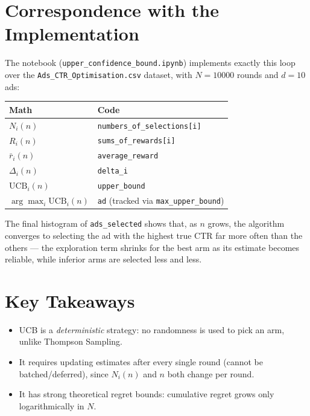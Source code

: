 \documentclass[11pt]{article}
\begin{document}
\section{Correspondence with the Implementation}

The notebook (\texttt{upper\_confidence\_bound.ipynb}) implements exactly
this loop over the \texttt{Ads\_CTR\_Optimisation.csv} dataset, with
$N = 10000$ rounds and $d = 10$ ads:

\begin{center}
\begin{tabular}{ll}
\textbf{Math} & \textbf{Code} \\
\hline
$N_i(n)$ & \texttt{numbers\_of\_selections[i]} \\
$R_i(n)$ & \texttt{sums\_of\_rewards[i]} \\
$\bar{r}_i(n)$ & \texttt{average\_reward} \\
$\Delta_i(n)$ & \texttt{delta\_i} \\
$\text{UCB}_i(n)$ & \texttt{upper\_bound} \\
$\arg\max_i \text{UCB}_i(n)$ & \texttt{ad} (tracked via \texttt{max\_upper\_bound}) \\
\end{tabular}
\end{center}

The final histogram of \texttt{ads\_selected} shows that, as $n$ grows, the
algorithm converges to selecting the ad with the highest true CTR far more
often than the others --- the exploration term shrinks for the best arm
as its estimate becomes reliable, while inferior arms are selected less
and less.

\section{Key Takeaways}

\begin{itemize}
  \item UCB is a \emph{deterministic} strategy: no randomness is used to
        pick an arm, unlike Thompson Sampling.
  \item It requires updating estimates after every single round (cannot be
        batched/deferred), since $N_i(n)$ and $n$ both change per round.
  \item It has strong theoretical regret bounds: cumulative regret grows
        only logarithmically in $N$.
\end{itemize}
\end{document}
